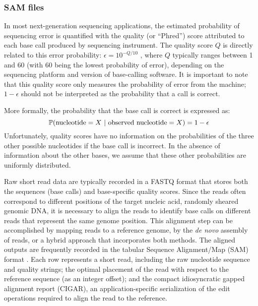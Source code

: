 \documentclass[10pt]{article}
\begin{document}
\subsubsection{SAM files}

In most next-generation sequencing applications, the estimated probability of sequencing error is quantified with the quality (or ``Phred'') score attributed to each base call produced by sequencing instrument.
The quality score $Q$ is directly related to this error probability: $\epsilon = 10^{-Q/10}$ \citep{ewingBaseCallingAutomatedSequencer1998}, where $Q$ typically ranges between 1 and 60 (with 60 being the lowest probability of error), depending on the sequencing platform and version of base-calling software.
It is important to note that this quality score only measures the probability of error from the machine; $1 - \epsilon$ should not be interpreted as the probability that a call is correct.

More formally, the probability that the base call is correct is expressed as: 
\begin{equation}
\label{eq:basecall}
\mathbb{P}(\text{nucleotide}=X \,\,|\,\, \text{observed nucleotide} = X) = 1 - \epsilon
\end{equation}
Unfortunately, quality scores have no information on the probabilities of the three other possible nucleotides if the base call is incorrect.
In the absence of information about the other bases, we assume that these other probabilities are uniformly distributed.


Raw short read data are typically recorded in a FASTQ format that stores both the sequences (base calls) and base-specific quality scores.
Since the reads often correspond to different positions of the target nucleic acid, \eg randomly sheared genomic DNA, it is necessary to align the reads to identify base calls on different reads that represent the same genome position.
This alignment step can be accomplished by mapping reads to a reference genome, by the \emph{de novo} assembly of reads, or a hybrid approach that incorporates both methods.
The aligned outputs are frequently recorded in the tabular Sequence Alignment/Map (SAM) format \citep{liSequenceAlignmentMap2009}.
Each row represents a short read, including the raw nucleotide sequence and quality strings; the optimal placement of the read with respect to the reference sequence (as an integer offset); and the compact idiosyncratic gapped alignment report (CIGAR), an application-specific serialization of the edit operations required to align the read to the reference.
\end{document}
